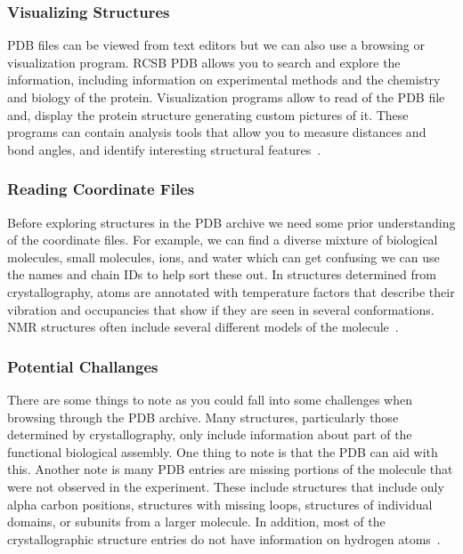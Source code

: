 \documentclass[]{final_report}
\begin{document}
\clearpage

\subsubsection{Visualizing Structures}

PDB files can be viewed from text editors but we can also use a browsing or visualization program. RCSB PDB allows you to search and explore the information, including information on experimental methods and the chemistry and biology of the protein. Visualization programs allow to read of the PDB file and, display the protein structure generating custom pictures of it. These programs can contain analysis tools that allow you to measure distances and bond angles, and identify interesting structural features~\cite{noauthor_pdb101_nodate}.

\subsubsection{Reading Coordinate Files}

Before exploring structures in the PDB archive we need some prior understanding of the coordinate files. For example, we can find a diverse mixture of biological molecules, small molecules, ions, and water which can get confusing we can use the names and chain IDs to help sort these out. In structures determined from crystallography, atoms are annotated with temperature factors that describe their vibration and occupancies that show if they are seen in several conformations. NMR structures often include several different models of the molecule~\cite{noauthor_pdb101_nodate}.

\subsubsection{Potential Challanges}

There are some things to note as you could fall into some challenges when browsing through the PDB archive. Many structures, particularly those determined by crystallography, only include information about part of the functional biological assembly. One thing to note is that the PDB can aid with this. Another note is many PDB entries are missing portions of the molecule that were not observed in the experiment. These include structures that include only alpha carbon positions, structures with missing loops, structures of individual domains, or subunits from a larger molecule. In addition, most of the crystallographic structure entries do not have information on hydrogen atoms~\cite{noauthor_pdb101_nodate}.
\end{document}

